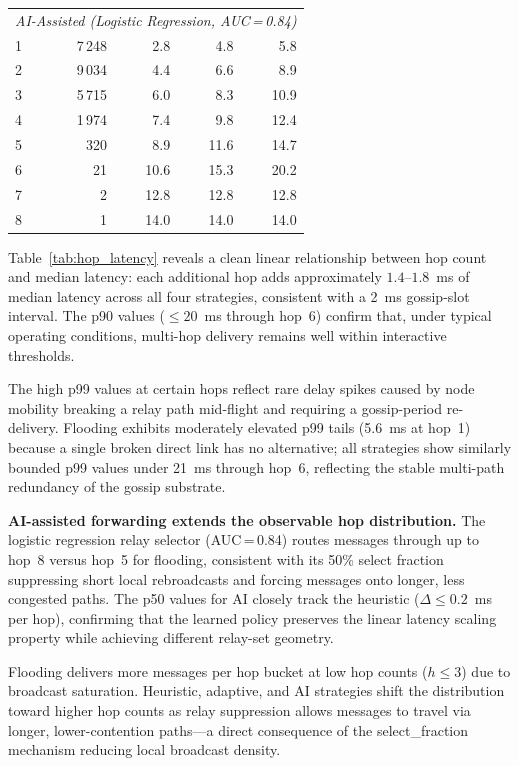 \documentclass[conference]{IEEEtran}
\begin{document}
\begin{table}[!t]
\begin{tabular}{lrrrr}
    \midrule
    \multicolumn{5}{l}{\textit{AI-Assisted (Logistic Regression, AUC\,=\,0.84)}} \\
    1 &  7\,248 &   2.8  &   4.8  &     5.8    \\
    2 &  9\,034 &   4.4  &   6.6  &     8.9    \\
    3 &  5\,715 &   6.0  &   8.3  &    10.9    \\
    4 &  1\,974 &   7.4  &   9.8  &    12.4    \\
    5 &    320 &   8.9  &  11.6  &    14.7    \\
    6 &     21 &  10.6  &  15.3  &    20.2    \\
    7 &      2 &  12.8  &  12.8  &    12.8    \\
    8 &      1 &  14.0  &  14.0  &    14.0    \\
    \bottomrule
  \end{tabular}
\end{table}

Table~\ref{tab:hop_latency} reveals a clean linear relationship between hop
count and median latency: each additional hop adds approximately
$1.4$--$1.8$~ms of median latency across all four strategies, consistent
with a 2~ms gossip-slot interval.  The p90 values ($\leq 20$~ms through hop~6)
confirm that, under typical operating conditions, multi-hop delivery remains
well within interactive thresholds.

The high p99 values at certain hops reflect rare delay spikes caused by node
mobility breaking a relay path mid-flight and requiring a gossip-period
re-delivery.  Flooding exhibits moderately elevated p99 tails (5.6~ms at hop~1) because a
single broken direct link has no alternative; all strategies show similarly
bounded p99 values under 21~ms through hop~6, reflecting the stable multi-path
redundancy of the gossip substrate.

\textbf{AI-assisted forwarding extends the observable hop distribution.}
The logistic regression relay selector (AUC\,=\,0.84) routes messages through
up to hop~8 versus hop~5 for flooding, consistent with its 50\% select fraction
suppressing short local rebroadcasts and forcing messages onto longer, less
congested paths.  The p50 values for AI closely track the heuristic
($\Delta \leq 0.2$~ms per hop), confirming that the learned policy preserves
the linear latency scaling property while achieving different relay-set geometry.

Flooding delivers more messages per hop bucket at low hop counts ($h \leq 3$)
due to broadcast saturation.  Heuristic, adaptive, and AI strategies shift the
distribution toward higher hop counts as relay suppression allows messages to
travel via longer, lower-contention paths---a direct consequence of the
select\_fraction mechanism reducing local broadcast density.
\end{document}
